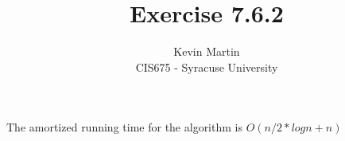 \documentclass{article}
\author{Kevin Martin\\ CIS675 - Syracuse University}
\title{Exercise 7.6.2}
\begin{document}
\maketitle
The amortized running time for the algorithm is $O(n/2*logn+n)$
\end{document}
